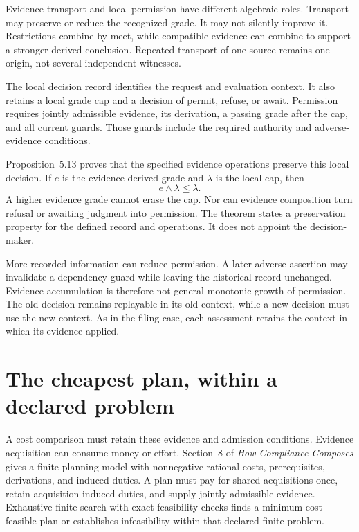 \documentclass{momentum}
\begin{document}
Evidence transport and local permission have different algebraic roles. Transport may preserve or reduce the recognized grade. It may not silently improve it. Restrictions combine by meet, while compatible evidence can combine to support a stronger derived conclusion. Repeated transport of one source remains one origin, not several independent witnesses. \cite[Sections~5.1--5.5]{composes}

The local decision record identifies the request and evaluation context. It also retains a local grade cap and a decision of permit, refuse, or await. Permission requires jointly admissible evidence, its derivation, a passing grade after the cap, and all current guards. Those guards include the required authority and adverse-evidence conditions.

Proposition~5.13 proves that the specified evidence operations preserve this local decision. If $e$ is the evidence-derived grade and $\lambda$ is the local cap, then
\[
e\wedge\lambda\leq\lambda.
\]
A higher evidence grade cannot erase the cap. Nor can evidence composition turn refusal or awaiting judgment into permission. The theorem states a preservation property for the defined record and operations. It does not appoint the decision-maker. \cite[Section~5.5, Recognition preserves reserved local decisions]{composes}

More recorded information can reduce permission. A later adverse assertion may invalidate a dependency guard while leaving the historical record unchanged. Evidence accumulation is therefore not general monotonic growth of permission. The old decision remains replayable in its old context, while a new decision must use the new context. As in the filing case, each assessment retains the context in which its evidence applied.

\section{The cheapest plan, within a declared problem}

A cost comparison must retain these evidence and admission conditions. Evidence acquisition can consume money or effort. Section~8 of \emph{How Compliance Composes} gives a finite planning model with nonnegative rational costs, prerequisites, derivations, and induced duties. A plan must pay for shared acquisitions once, retain acquisition-induced duties, and supply jointly admissible evidence. Exhaustive finite search with exact feasibility checks finds a minimum-cost feasible plan or establishes infeasibility within that declared finite problem. \cite[Definition~8.1 and Proposition~8.2]{composes}
\end{document}
